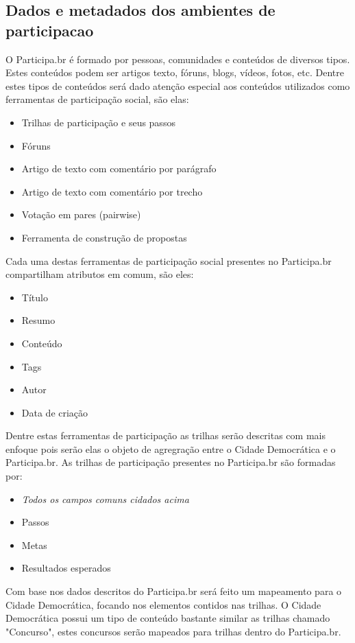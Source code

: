 \documentclass[12pt]{article}
\begin{document}
\subsection{Dados e metadados dos ambientes de participacao}

O Participa.br é formado por pessoas, comunidades e conteúdos de diversos
tipos. Estes conteúdos podem ser artigos texto, fóruns, blogs, vídeos, fotos,
etc. Dentre estes tipos de conteúdos será dado atenção especial aos conteúdos
utilizados como ferramentas de participação social, são elas:

\begin{itemize}
  \item Trilhas de participação e seus passos
  \item Fóruns
  \item Artigo de texto com comentário por parágrafo
  \item Artigo de texto com comentário por trecho
  \item Votação em pares (pairwise)
  \item Ferramenta de construção de propostas
\end{itemize}

Cada uma destas ferramentas de participação social presentes no Participa.br
compartilham atributos em comum, são eles:

\begin{itemize}
  \item Título
  \item Resumo
  \item Conteúdo
  \item Tags
  \item Autor
  \item Data de criação
\end{itemize}

Dentre estas ferramentas de participação as trilhas serão descritas com mais
enfoque pois serão elas o objeto de agregração entre o Cidade Democrática e o
Participa.br. As trilhas de participação presentes no Participa.br são
formadas por:

\begin{itemize}
  \item {\it Todos os campos comuns cidados acima}
  \item Passos
  \item Metas
  \item Resultados esperados
\end{itemize}

Com base nos dados descritos do Participa.br será feito um mapeamento
para o Cidade Democrática, focando nos elementos contidos nas trilhas. O Cidade
Democrática possui um tipo de conteúdo bastante similar as trilhas chamado
"Concurso", estes concursos serão mapeados para trilhas dentro do
Participa.br.
\end{document}
